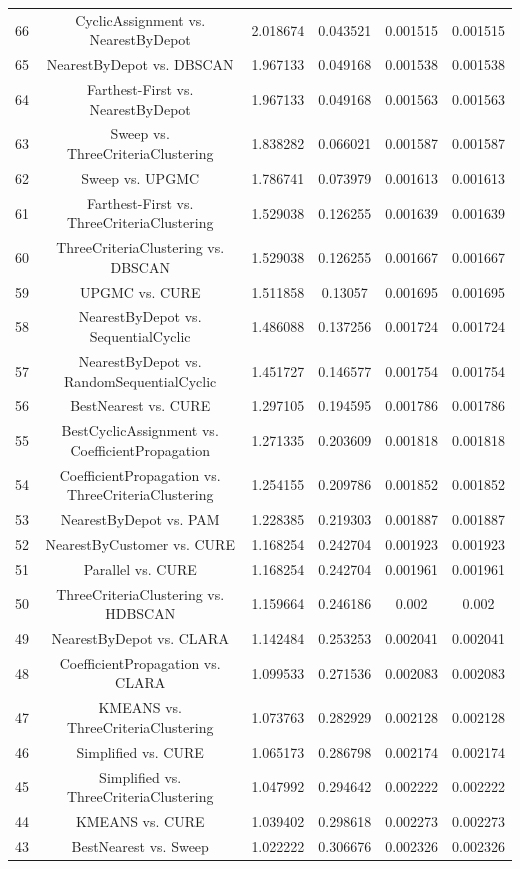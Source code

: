 \documentclass[a4paper,10pt]{article}
\begin{document}
\begin{landscape}
\begin{table}[!htp]
\begin{tabular}{cccccc}
66&CyclicAssignment vs. NearestByDepot&2.018674&0.043521&0.001515&0.001515\\
65&NearestByDepot vs. DBSCAN&1.967133&0.049168&0.001538&0.001538\\
64&Farthest-First vs. NearestByDepot&1.967133&0.049168&0.001563&0.001563\\
63&Sweep vs. ThreeCriteriaClustering&1.838282&0.066021&0.001587&0.001587\\
62&Sweep vs. UPGMC&1.786741&0.073979&0.001613&0.001613\\
61&Farthest-First vs. ThreeCriteriaClustering&1.529038&0.126255&0.001639&0.001639\\
60&ThreeCriteriaClustering vs. DBSCAN&1.529038&0.126255&0.001667&0.001667\\
59&UPGMC vs. CURE&1.511858&0.13057&0.001695&0.001695\\
58&NearestByDepot vs. SequentialCyclic&1.486088&0.137256&0.001724&0.001724\\
57&NearestByDepot vs. RandomSequentialCyclic&1.451727&0.146577&0.001754&0.001754\\
56&BestNearest vs. CURE&1.297105&0.194595&0.001786&0.001786\\
55&BestCyclicAssignment vs. CoefficientPropagation&1.271335&0.203609&0.001818&0.001818\\
54&CoefficientPropagation vs. ThreeCriteriaClustering&1.254155&0.209786&0.001852&0.001852\\
53&NearestByDepot vs. PAM&1.228385&0.219303&0.001887&0.001887\\
52&NearestByCustomer vs. CURE&1.168254&0.242704&0.001923&0.001923\\
51&Parallel vs. CURE&1.168254&0.242704&0.001961&0.001961\\
50&ThreeCriteriaClustering vs. HDBSCAN&1.159664&0.246186&0.002&0.002\\
49&NearestByDepot vs. CLARA&1.142484&0.253253&0.002041&0.002041\\
48&CoefficientPropagation vs. CLARA&1.099533&0.271536&0.002083&0.002083\\
47&KMEANS vs. ThreeCriteriaClustering&1.073763&0.282929&0.002128&0.002128\\
46&Simplified vs. CURE&1.065173&0.286798&0.002174&0.002174\\
45&Simplified vs. ThreeCriteriaClustering&1.047992&0.294642&0.002222&0.002222\\
44&KMEANS vs. CURE&1.039402&0.298618&0.002273&0.002273\\
43&BestNearest vs. Sweep&1.022222&0.306676&0.002326&0.002326\\

\end{tabular}
\end{table}
\end{landscape}
\end{document}
